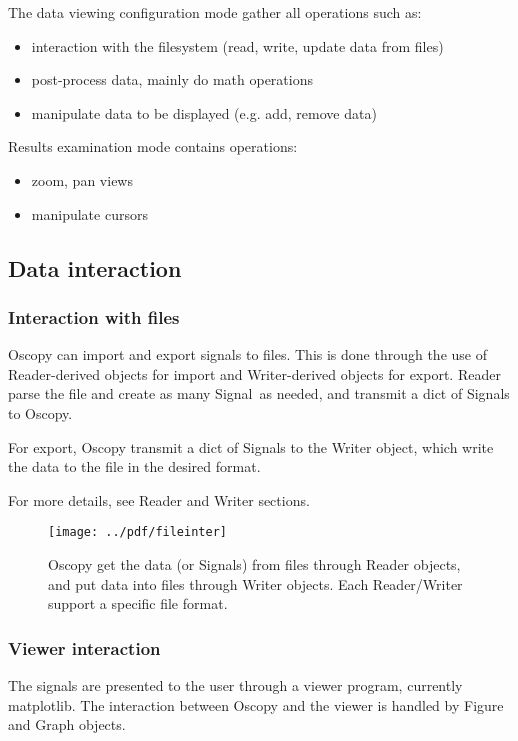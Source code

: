 \documentclass[a4paper,11pt]{article}
\newcommand{\sig}{\textsf{Signal}}
\begin{document}
The data viewing configuration mode gather all operations such as:
\begin{itemize}
\item interaction with the filesystem (read, write, update data from files)
\item post-process data, mainly do math operations
\item manipulate data to be displayed (e.g. add, remove data)
\end{itemize}
Results examination mode contains operations:
\begin{itemize}
\item zoom, pan views
\item manipulate cursors
\end{itemize}

\subsection{Data interaction}
\label{sec:data}

\subsubsection{Interaction with files}
\label{sec:fileinter}
Oscopy can import and export signals to files.
This is done through the use of Reader-derived objects for import and Writer-derived objects for export.
Reader parse the file and create as many \sig\ as needed, and transmit a dict of \sig s to Oscopy.

For export, Oscopy transmit a dict of \sig s to the Writer object, which write the data to the file in the desired format.

For more details, see Reader and Writer sections.

\begin{figure}[htbp]
  \centering
  \texttt{[image: ../pdf/fileinter]}
  \caption{Oscopy get the data (or \sig s) from files through Reader objects, and put data into files through Writer objects. Each Reader/Writer support a specific file format.}
  \label{fig:fileinter}
\end{figure}

\subsubsection{Viewer interaction}
\label{sec:viewinter}
The signals are presented to the user through a viewer program, currently matplotlib.
The interaction between Oscopy and the viewer is handled by Figure and Graph objects.
\end{document}
